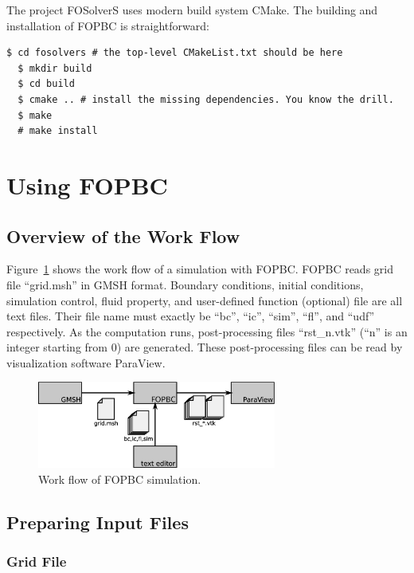 \documentclass[]{article}
\begin{document}
The project FOSolverS uses modern build system CMake.
The building and installation of FOPBC is straightforward:
\begin{lstlisting}[backgroundcolor=\color{lightgray}]
  $ cd fosolvers # the top-level CMakeList.txt should be here
  $ mkdir build
  $ cd build
  $ cmake .. # install the missing dependencies. You know the drill.
  $ make
  # make install
\end{lstlisting}

\section{Using FOPBC}

\subsection{Overview of the Work Flow}

Figure~\ref{fig:flow} shows the work flow of a simulation with FOPBC.
FOPBC reads grid file ``grid.msh'' in GMSH format.
Boundary conditions, initial conditions, simulation control, fluid property, and user-defined
function (optional) file are all text files.
Their file name must exactly be ``bc'', ``ic'', ``sim'', ``fl'', and ``udf'' respectively.
As the computation runs, post-processing files ``rst\_n.vtk'' (``n'' is an integer starting from 0)
are generated.
These post-processing files can be read by visualization software ParaView.

\begin{figure}[h!]
  \centering
  \includegraphics[width=0.7\textwidth]{flow.eps}
  \caption{Work flow of FOPBC simulation.}
  \label{fig:flow}
\end{figure}

\subsection{Preparing Input Files}

\subsubsection{Grid File}
\label{sec:grid}
\end{document}
